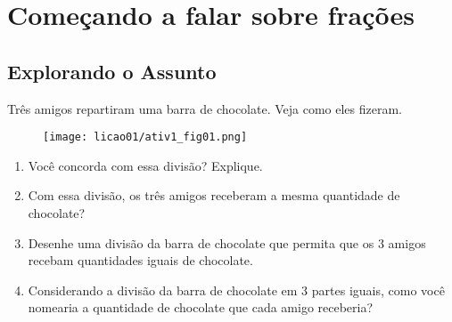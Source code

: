 
\chapter{Começando a falar sobre frações}
\tikzset{x=1cm,y=1cm}

\section{Explorando o Assunto}
\begin{atividade}{}\label{chap1-ativ1}

Três amigos repartiram uma barra de chocolate. Veja como eles fizeram.

\begin{figure}[H]
\centering

\texttt{[image: licao01/ativ1\_fig01.png]}
\end{figure}

\begin{enumerate} %
  \item Você concorda com essa divisão? Explique.
  \item Com essa divisão, os três amigos receberam a mesma quantidade de chocolate?
  \item Desenhe uma divisão da barra de chocolate que permita que os 3 amigos recebam quantidades iguais de chocolate.

\begin{figure}[H]
\centering

\end{figure}

  \item Considerando a divisão da barra de chocolate em 3 partes iguais, como você nomearia a quantidade de chocolate que cada amigo receberia?
\end{enumerate} %

\end{atividade}


